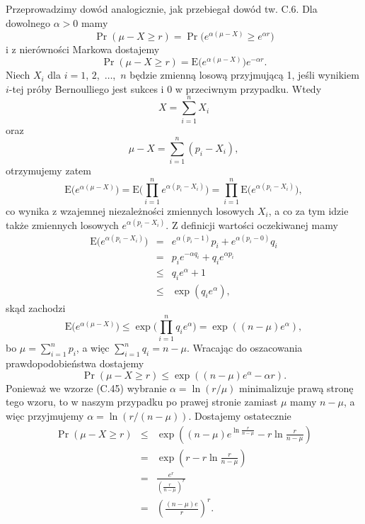 \subsection{} %
Przeprowadzimy dowód analogicznie, jak przebiegał dowód tw. C.6. Dla dowolnego $\alpha>0$ mamy
\[
	\Pr(\mu-X\ge r) = \Pr\bigl(e^{\alpha(\mu-X)}\ge e^{\alpha r}\bigr)
\]
i z nierówności Markowa dostajemy
\[
	\Pr(\mu-X\ge r) = \mathrm{E}\bigl(e^{\alpha(\mu-X)}\bigr)e^{-\alpha r}.
\]
Niech $X_i$ dla $i=1$, $2$,~$\dots$,~$n$ będzie zmienną losową przyjmującą 1, jeśli wynikiem $i$-tej próby Bernoulliego jest sukces i 0 w przeciwnym przypadku. Wtedy
\[
	X = \sum_{i=1}^nX_i
\]
oraz
\[
	\mu-X = \sum_{i=1}^n(p_i-X_i),
\]
otrzymujemy zatem
\[
	\mathrm{E}\bigl(e^{\alpha(\mu-X)}\bigr) = \mathrm{E}\biggl(\prod_{i=1}^ne^{\alpha(p_i-X_i)}\biggr) = \prod_{i=1}^n\mathrm{E}\bigl(e^{\alpha(p_i-X_i)}\bigr),
\]
co wynika z wzajemnej niezależności zmiennych losowych $X_i$, a co za tym idzie także zmiennych losowych $e^{\alpha(p_i-X_i)}$. Z definicji wartości oczekiwanej mamy
\begin{eqnarray*}
	\mathrm{E}\bigl(e^{\alpha(p_i-X_i)}\bigr) &=& e^{\alpha(p_i-1)}p_i+e^{\alpha(p_i-0)}q_i \\
	&=& p_ie^{-\alpha q_i}+q_ie^{\alpha p_i} \\
	&\le& q_ie^{\alpha}+1 \\
	&\le& \exp(q_ie^\alpha),
\end{eqnarray*}
skąd zachodzi
\[
	\mathrm{E}\bigl(e^{\alpha(\mu-X)}\bigr) \le \exp\biggl(\prod_{i=1}^nq_ie^\alpha\biggr) = \exp((n-\mu)e^\alpha),
\]
bo $\mu=\sum_{i=1}^np_i$, a więc $\sum_{i=1}^nq_i=n-\mu$. Wracając do oszacowania prawdopodobieństwa dostajemy
\[
	\Pr(\mu-X\ge r) \le \exp((n-\mu)e^\alpha-\alpha r).
\]
Ponieważ we wzorze (C.45) wybranie $\alpha=\ln(r/\mu)$ minimalizuje prawą stronę tego wzoru, to w naszym przypadku po prawej stronie zamiast $\mu$ mamy $n-\mu$, a więc przyjmujemy $\alpha=\ln(r/(n-\mu))$. Dostajemy ostatecznie
\begin{eqnarray*}
	\Pr(\mu-X\ge r) &\le& \exp\left((n-\mu)e^{\ln\frac{r}{n-\mu}}-r\ln\frac{r}{n-\mu}\right) \\
	&=& \exp\left(r-r\ln\frac{r}{n-\mu}\right) \\
	&=& \frac{e^r}{\left(\frac{r}{n-\mu}\right)^r} \\
	&=& \left(\frac{(n-\mu)e}{r}\right)^r.
\end{eqnarray*}

\subsection{} %
